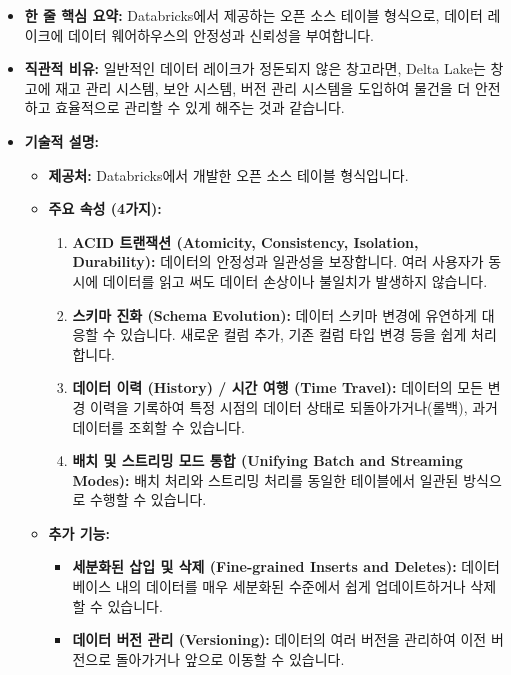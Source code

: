 \documentclass[11pt,a4paper]{article}
\begin{document}
\begin{itemize}
    \item \textbf{한 줄 핵심 요약:} Databricks에서 제공하는 오픈 소스 테이블 형식으로, 데이터 레이크에 데이터 웨어하우스의 안정성과 신뢰성을 부여합니다.
    \item \textbf{직관적 비유:} 일반적인 데이터 레이크가 정돈되지 않은 창고라면, Delta Lake는 창고에 재고 관리 시스템, 보안 시스템, 버전 관리 시스템을 도입하여 물건을 더 안전하고 효율적으로 관리할 수 있게 해주는 것과 같습니다.
    \item \textbf{기술적 설명:}
    \begin{itemize}
        \item \textbf{제공처:} Databricks에서 개발한 오픈 소스 테이블 형식입니다.
        \item \textbf{주요 속성 (4가지):}
        \begin{enumerate}
            \item \textbf{ACID 트랜잭션 (Atomicity, Consistency, Isolation, Durability):} 데이터의 안정성과 일관성을 보장합니다. 여러 사용자가 동시에 데이터를 읽고 써도 데이터 손상이나 불일치가 발생하지 않습니다.
            \item \textbf{스키마 진화 (Schema Evolution):} 데이터 스키마 변경에 유연하게 대응할 수 있습니다. 새로운 컬럼 추가, 기존 컬럼 타입 변경 등을 쉽게 처리합니다.
            \item \textbf{데이터 이력 (History) / 시간 여행 (Time Travel):} 데이터의 모든 변경 이력을 기록하여 특정 시점의 데이터 상태로 되돌아가거나(롤백), 과거 데이터를 조회할 수 있습니다.
            \item \textbf{배치 및 스트리밍 모드 통합 (Unifying Batch and Streaming Modes):} 배치 처리와 스트리밍 처리를 동일한 테이블에서 일관된 방식으로 수행할 수 있습니다.
        \end{enumerate}
        \item \textbf{추가 기능:}
        \begin{itemize}
            \item \textbf{세분화된 삽입 및 삭제 (Fine-grained Inserts and Deletes):} 데이터베이스 내의 데이터를 매우 세분화된 수준에서 쉽게 업데이트하거나 삭제할 수 있습니다.
            \item \textbf{데이터 버전 관리 (Versioning):} 데이터의 여러 버전을 관리하여 이전 버전으로 돌아가거나 앞으로 이동할 수 있습니다.
        \end{itemize}
    \end{itemize}
\end{itemize}
\end{document}
